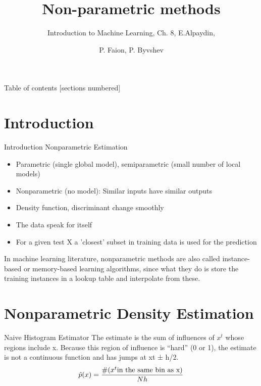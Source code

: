 \documentclass{beamer}
\title{Non-parametric methods}
\subtitle{Introduction to 
Machine Learning, Ch. 8, E.Alpaydin, }
\date{}
\author{P. Faion, P. Byvshev}
\institute{UOs}
\begin{document}
\maketitle

\begin{frame}{Table of contents}
  [sections numbered]
  \tableofcontents[hideallsubsections]
\end{frame}

\section{Introduction}

\begin{frame}[fragile]{Introduction}
Nonparametric Estimation
	\begin{itemize}
		\item Parametric (single global model), semiparametric (small number of local models)
		\item Nonparametric (no model): Similar inputs have similar outputs
		\item Density function, discriminant change smoothly
		\item The data speak for itself
        \item For a given test X a 'closest' subset in training data is used for the prediction 
	\end{itemize}
In machine learning literature, nonparametric methods are also called
instance-based or memory-based learning algorithms, since what they do
is store the training instances in a lookup table and interpolate from
these.
    



\end{frame}


\section{Nonparametric Density Estimation}

\begin{frame}[fragile]{Naive Histogram Estimator}
The estimate is the sum of influences of $x^t$ whose regions include x.
Because this region of influence is “hard” (0 or 1), the estimate is not a
continuous function and has jumps at xt ± h/2.
	\begin{equation}
		\hat p(x)=\frac{\#(x^t \textnormal{in the same bin as x})}{Nh}
	\end{equation}

\end{frame}
\end{document}
